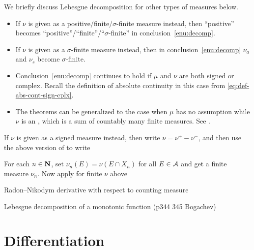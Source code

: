 We briefly discuss Lebesgue decomposition for other types of measures below.
\begin{itemize}
    \item If $\nu$ is given as a positive/finite/$\sigma$-finite measure instead, then ``positive'' becomes ``positive''/``finite''/``$\sigma$-finite'' in conclusion~\ref{enu:decomp}.
    \item If $\nu$ is given as a $\sigma$-finite measure instead, then in conclusion~\ref{enu:decomp} $\nu_a$ and $\nu_s$ become $\sigma$-finite.
    \item Conclusion~\ref{enu:decomp} continues to hold if $\mu$ and $\nu$ are both signed or complex. Recall the definition of absolute continuity in this case from \eqref{eq:def-abs-cont-sign-cplx}.
    \item The theorems can be generalized to the case when $\mu$ has no assumption while $\nu$ is an , which is a sum of countably many finite measures. See \cite{Falkner_2019}.
\end{itemize}
\begin{rem}
    
    If $\nu$ is given as a signed measure instead, then write $\nu = \nu^+ - \nu^-$, and then use the above version of  to write
    
    For each $n\in \mathbf{N}$, set $\nu_n (E) = \nu(E\cap X_n)$ for all $E\in \mathcal{A}$ and get a finite measure $\nu_n$. Now apply  for finite $\nu$ above
\end{rem}

Radon--Nikodym derivative with respect to counting measure

Lebesgue decomposition of a monotonic function (p344 345 Bogachev) %
\section{Differentiation}
\begin{namedthm}
    
\end{namedthm}

